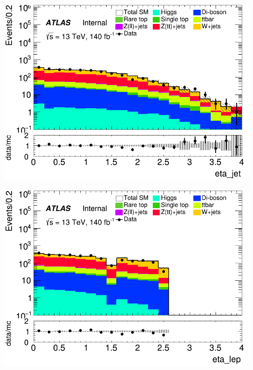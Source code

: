 \documentclass[usenames,dvipsnames]{beamer}
\begin{document}
\begin{frame}
    \begin{minipage}{0.32\textwidth}
        \centering
        \includegraphics[width=\textwidth]{graphics/H_met/H_met_eta_jet.png}
    \end{minipage}
    \hfill
    \begin{minipage}{0.32\textwidth}
        \centering
        \includegraphics[width=\textwidth]{graphics/H_met/H_met_eta_lep.png}
    \end{minipage}
    \hfill
    \begin{minipage}{0.32\textwidth}
        \centering

\end{minipage}
\end{frame}
\end{document}
